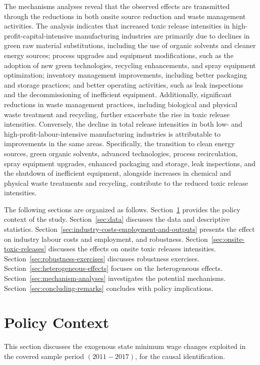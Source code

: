 \documentclass{C:/Users/david/OneDrive/Documents/ULMS/PhD/Thesis/chapter3/src/climate_change/latex/Economic_Journal/OUP-EJ}
\begin{document}
    The mechanisms analyses reveal that the observed effects are transmitted through the reductions in both onsite source reduction and waste management activities. The analysis indicates that increased toxic release intensities in high-profit-capital-intensive manufacturing industries are primarily due to declines in green raw material substitutions, including the use of organic solvents and cleaner energy sources; process upgrades and equipment modifications, such as the adoption of new green technologies, recycling enhancements, and spray equipment optimization; inventory management improvements, including better packaging and storage practices; and better operating activities, such as leak inspections and the decommissioning of inefficient equipment. Additionally, significant reductions in waste management practices, including biological and physical waste treatment and recycling, further exacerbate the rise in toxic release intensities. Conversely, the decline in total release intensities in both low- and high-profit-labour-intensive manufacturing industries is attributable to improvements in the same areas. Specifically, the transition to clean energy sources, green organic solvents, advanced technologies, process recirculation, spray equipment upgrades, enhanced packaging and storage, leak inspections, and the shutdown of inefficient equipment, alongside increases in chemical and physical waste treatments and recycling, contribute to the reduced toxic release intensities.

    The following sections are organized as follows. Section~\ref{sec:policy-context} provides the policy context of the study. Section~\ref{sec:data} discusses the data and descriptive statistics. Section~\ref{sec:industry-costs-employment-and-outputs} presents the effect on industry labour costs and employment, and robustness. Section~\ref{sec:onsite-toxic-releases} discusses the effects on onsite toxic releases intensities. Section~\ref{sec:robustness-exercises} discusses robustness exercises. Section~\ref{sec:heterogeneous-effects} focuses on the heterogeneous effects. Section~\ref{sec:mechanism-analyses} investigates the potential mechanisms. Section~\ref{sec:concluding-remarks} concludes with policy implications.


    \section{Policy Context}\label{sec:policy-context}
    This section discusses the exogenous state minimum wage changes exploited in the covered sample period $(2011-2017)$, for the causal identification.
\end{document}
